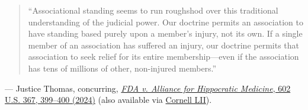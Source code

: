 \documentclass[12pt]{article}
\begin{document}
\begin{quote}
``Associational standing seems to run roughshod over this traditional understanding of the judicial power. Our doctrine permits an association to have standing based purely upon a member's injury, not its own. If a single member of an association has suffered an injury, our doctrine permits that association to seek relief for its entire membership---even if the association has tens of millions of other, non-injured members.''
\end{quote}
\noindent --- Justice Thomas, concurring, \href{https://www.supremecourt.gov/opinions/23pdf/602us1r35_bqmd.pdf}{\textit{FDA v. Alliance for Hippocratic Medicine}, 602 U.S. 367, 399--400 (2024)} (also available via \href{https://www.law.cornell.edu/supremecourt/text/23-235}{Cornell LII}).
\end{document}
